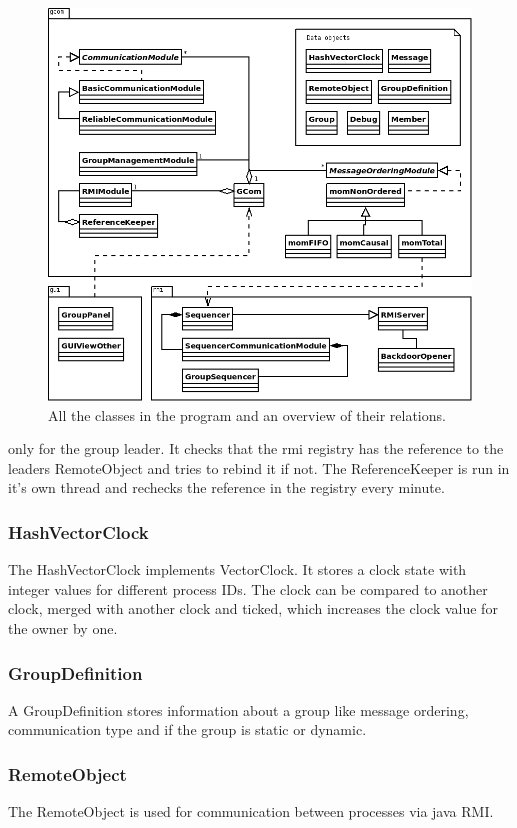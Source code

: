 \documentclass[english]{article}
\begin{document}
\begin{figure}
\includegraphics[width=\textwidth]{superuml.png}
\caption{All the classes in the program and an overview of their relations.}
\label{fig:overview}
\end{figure}only for the group leader. It checks that the rmi registry has the reference to the leaders RemoteObject and tries to rebind it if not. The ReferenceKeeper is run in it's own thread and rechecks the reference in the registry every minute.

\subsubsection{HashVectorClock}
The HashVectorClock implements VectorClock. It stores a clock state with integer values for different process IDs. The clock can be compared to another clock, merged with another clock and ticked, which increases the clock value for the owner by one.

\subsubsection{GroupDefinition}
A GroupDefinition stores information about a group like message ordering, communication type and if the group is static or dynamic. 

\subsubsection{RemoteObject}
The RemoteObject is used for communication between processes via java RMI. 
\end{document}
